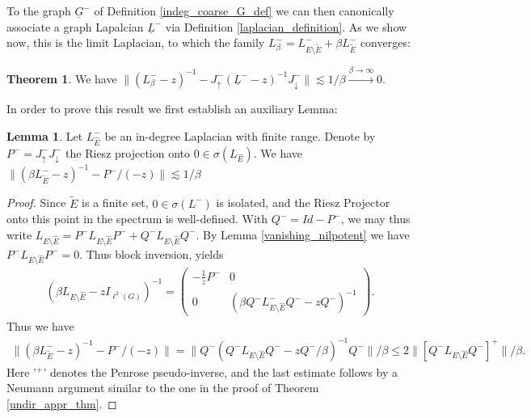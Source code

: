 \documentclass[reqno,12pt,letterpaper]{amsart}
\numberwithin{equation}{section}
\newcommand{\Lin}{L^{-}}
\newcommand{\1}{\mathds{1}}
\theoremstyle{definition}
\newtheorem{Thm}[Th]{Theorem}
\newtheorem{Lem}[Th]{Lemma}
\begin{document}
	
	 \medskip 
	To the graph $\underline{G}^-$ of Definition \ref{indeg_coarse_G_def} we can then canonically associate a graph Lapalcian $\underline{L}^-$ via  Definition \ref{laplacian_definition}. As we show now, this is the limit Laplacian, to which the family $\Lin_\beta = \Lin_{E \setminus \tilde{E}} + \beta \Lin_{\tilde{E}}$ converges:
\begin{Thm}\label{-_conv_theorem}
	We have
$
		\| (\Lin_\beta - z)^{-1} - J^-_{\uparrow} (\underline{L}^- -z)^{-1}  J^-_\downarrow \|
		\lesssim 1/\beta \xrightarrow{\beta \rightarrow \infty} 0.
$
\end{Thm}
In order to prove this result we first establish an auxiliary Lemma:
\begin{Lem}\label{aux_lemma_-}
Let $\Lin_{\hat{E}}$	be an in-degree Laplacian with finite range. Denote by $P^- = J^-_\uparrow J^-_\downarrow$ the Riesz projection onto $0 \in \sigma(L_{\hat{E}})$. We have
$
	\|  (\beta \Lin_{\tilde{E}} - z)^{-1} - P^-/(-z)  \| \lesssim 1/\beta 
$
\end{Lem}
\begin{proof} 
	Since $\tilde{E}$ is a finite set, $0 \in \sigma(\Lin)$ is isolated, and the Riesz Projector onto this point in the spectrum is well-defined.
	With $Q^- = Id - P^-$, we may thus write
	$L_{E \setminus \hat{E}} = P^- L_{E \setminus \hat{E}} P^- + Q^- L_{E \setminus \hat{E}} Q^-$.  By
	Lemma \ref{vanishing_nilpotent} we have
	$P^- L_{E \setminus \hat{E}} P^- = 0$. Thus block inversion, yields
	\begin{align}
		(\beta L_{E \setminus \hat{E}}  -z I_{\ell^2(G)})^{-1}
		=
		\begin{pmatrix}
			- \frac{1}{z} P^-  & 0 \\
			0 & (\beta Q^- \Lin_{E \setminus \hat{E}}  Q^- - zQ^-)^{-1} 
		\end{pmatrix}.
	\end{align}
	Thus we have 
	\begin{align}
		\|  (\beta \Lin_{\tilde{E}} - z)^{-1} - P^-/(-z)  \| = \|Q^-( Q^- L_{E \setminus \hat{E}}  Q^- - zQ^-/\beta)^{-1}Q^- \|/\beta \leq 2\| [Q^- L_{E \setminus \hat{E}}  Q^-]^+\|/\beta.
	\end{align}
	Here '$^+$' denotes the Penrose pseudo-inverse, and the last estimate follows by a Neumann argument similar to the one in the proof of Theorem \ref{undir_appr_thm}.
\end{proof}
\end{document}
